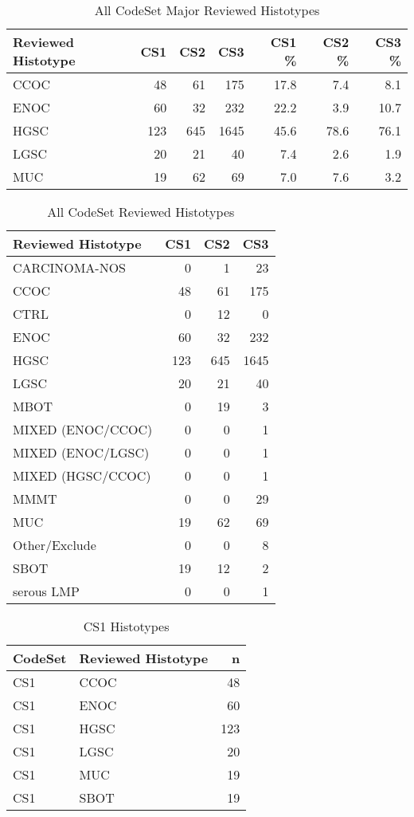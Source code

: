 \documentclass[
]{report}
\begin{document}
\begin{table}

\caption{\label{tab:dist-major-hist}All CodeSet Major Reviewed Histotypes}
\centering
\begin{tabular}[t]{l|r|r|r|r|r|r}
\hline
Reviewed Histotype & CS1 & CS2 & CS3 & CS1 \% & CS2 \% & CS3 \%\\
\hline
CCOC & 48 & 61 & 175 & 17.8 & 7.4 & 8.1\\
\hline
ENOC & 60 & 32 & 232 & 22.2 & 3.9 & 10.7\\
\hline
HGSC & 123 & 645 & 1645 & 45.6 & 78.6 & 76.1\\
\hline
LGSC & 20 & 21 & 40 & 7.4 & 2.6 & 1.9\\
\hline
MUC & 19 & 62 & 69 & 7.0 & 7.6 & 3.2\\
\hline
\end{tabular}
\end{table}

\begin{table}

\caption{\label{tab:dist-all}All CodeSet Reviewed Histotypes}
\centering
\begin{tabular}[t]{l|r|r|r}
\hline
Reviewed Histotype & CS1 & CS2 & CS3\\
\hline
CARCINOMA-NOS & 0 & 1 & 23\\
\hline
CCOC & 48 & 61 & 175\\
\hline
CTRL & 0 & 12 & 0\\
\hline
ENOC & 60 & 32 & 232\\
\hline
HGSC & 123 & 645 & 1645\\
\hline
LGSC & 20 & 21 & 40\\
\hline
MBOT & 0 & 19 & 3\\
\hline
MIXED (ENOC/CCOC) & 0 & 0 & 1\\
\hline
MIXED (ENOC/LGSC) & 0 & 0 & 1\\
\hline
MIXED (HGSC/CCOC) & 0 & 0 & 1\\
\hline
MMMT & 0 & 0 & 29\\
\hline
MUC & 19 & 62 & 69\\
\hline
Other/Exclude & 0 & 0 & 8\\
\hline
SBOT & 19 & 12 & 2\\
\hline
serous LMP & 0 & 0 & 1\\
\hline
\end{tabular}
\end{table}

\begin{table}

\caption{\label{tab:dist-cs1}CS1 Histotypes}
\centering
\begin{tabular}[t]{l|l|r}
\hline
CodeSet & Reviewed Histotype & n\\
\hline
CS1 & CCOC & 48\\
\hline
CS1 & ENOC & 60\\
\hline
CS1 & HGSC & 123\\
\hline
CS1 & LGSC & 20\\
\hline
CS1 & MUC & 19\\
\hline
CS1 & SBOT & 19\\
\hline
\end{tabular}
\end{table}
\end{document}
